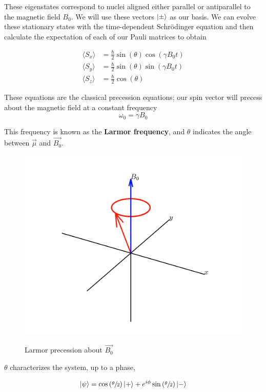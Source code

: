 \documentclass[%
 reprint,
 amsmath,amssymb,
 aps,
]{revtex4-2}
\DeclarePairedDelimiter\ket{\lvert}{\rangle}
\begin{document}
These eigenstates correspond to nuclei aligned either parallel or antiparallel to the magnetic field $B_0$. We will use these vectors $\ket{\pm}$ as our basis. We can evolve these stationary states with the time-dependent Schr\"odinger equation and then calculate the expectation of each of our Pauli matrices to obtain 

\begin{align*}
    \langle S_x \rangle &= \frac{\hbar}{2} \sin(\theta)\cos(\gamma B_0 t)\\
    \langle S_y \rangle &= \frac{\hbar}{2} \sin(\theta)\sin(\gamma B_0 t)\\
    \langle S_z \rangle &= \frac{\hbar}{2} \cos(\theta)   
\end{align*}

These equations are the classical precession equations; our spin vector will precess about the magnetic field at a constant frequency
\begin{equation}
    \omega_0 = \gamma B_0 
\end{equation}

This frequency is known as the \textbf{Larmor frequency}, and $\theta$ indicates the angle between $\vec{\mu}$ and $\vec{B_0}$. 

\begin{figure}[h]
    \centering
    {\includegraphics[width = 0.6\linewidth]{figs/larmor-precession.png}}

    \caption{Larmor precession about $\vec{B_0}$}
\end{figure}

$\theta$ characterizes the system, up to a phase,

\begin{equation}
    \ket{\psi} = \cos\left(\sfrac{\theta}{2}\right)\ket{+}+ e^{i\phi}\sin\left(\sfrac{\theta}{2}\right) \ket{-}
\end{equation}
\end{document}
